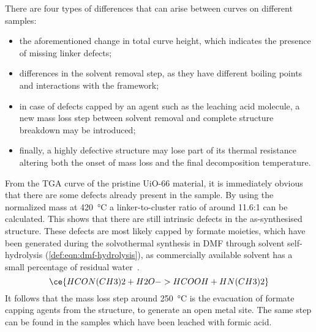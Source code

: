 There are four types of differences that can arise 
between curves on different samples:

\begin{itemize}
    \item the aforementioned change in total curve height,
    which indicates the presence of missing linker defects;
    \item differences in the solvent removal step, as they
    have different boiling points and interactions with the 
    framework;
    \item in case of defects capped by an agent such as 
    the leaching acid molecule, a new mass loss step between 
    solvent removal and complete structure breakdown
    may be introduced;
    \item finally, a highly defective structure may lose part 
    of its thermal resistance altering both the onset of mass
    loss and the final decomposition temperature.
\end{itemize}

From the \gls{TGA} curve of the pristine UiO-66 material, 
it is immediately obvious that there are some defects 
already present in the sample. By using the normalized
mass at \SI{420}{\degreeCelsius} a linker-to-cluster 
ratio of around 11.6:1 can be calculated. This shows that
there are still intrinsic defects in the as-synthesised 
structure. These defects are most likely capped by 
formate moieties, which have been generated during 
the solvothermal synthesis in \gls{DMF} through solvent 
self-hydrolysis (\autoref{def:eqn:dmf-hydrolysis}), as 
commercially available solvent has a small percentage of 
residual water~\cite{shearerDefectEngineeringTuning2016}.
%
\begin{equation}\label{def:eqn:dmf-hydrolysis}
    \ce{HCON(CH3)2 + H2O -> HCOOH + HN(CH3)2}
\end{equation}
%
It follows that the mass loss step around \SI{250}{\degreeCelsius}
is the evacuation of formate capping agents from the 
structure, to generate an open metal site. The same step
can be found in the samples which have been leached with
formic acid.

